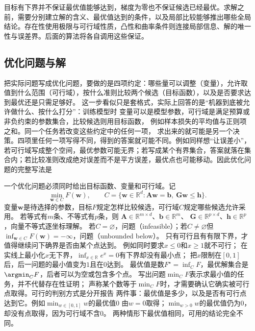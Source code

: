 目标有下界并不保证最优值能够达到，梯度为零也不保证候选已经最优。求解之前，需要分别建立解的含义、最优值达到的条件，以及局部比较能够推出哪些全局结论。存在性使用极限与可行域性质，凸性和曲率条件则连接局部信息、解的唯一性与误差界。后面的算法将各自调用这些保证。

\subsection{优化问题与解}
\label{sec:opt-problem-and-solutions}
\label{sec:opt-error-objects}

把实际问题写成优化问题，要做的是四项约定：哪些量可以调整（变量），允许取值到什么范围（可行域），按什么准则比较两个候选（目标函数），以及是否要求达到最优还是只需足够好。
这一步看似只是套格式，实际上回答的是“机器到底被允许做什么、按什么打分”：训练模型时
变量可以是模型参数，可行域是满足预算或非负约束的参数集合，比较候选则用目标函数，
例如样本损失的平均值与正则项之和。同一个任务若改变这些约定中的任何一项，
求出来的就可能是另一个决策。四项里任何一项写得不同，得到的答案就可能不同。例如同样想“让误差小”，若可行域写成整个空间，最优参数可能无界；若写成某个有界集合，答案就落在集合内；若比较准则改成绝对误差而不是平方误差，最优点也可能移动。因此优化问题的完整写法是

一个优化问题必须同时给出目标函数、变量和可行域。记
\[
  \min_{\bm{w}\in C}F(\bm{w}),\qquad
  C=\{\bm{w}\in\mathbb{R}^d:
  \bm{A}\bm{w}=\bm{b},\ \bm{G}\bm{w}\leq\bm{h}\}.
\]
变量$\bm w$是待选择的参数，目标$F$规定怎样比较候选，可行域$C$规定哪些候选允许采用。
若等式有$m$条、不等式有$p$条，则
$\bm A\in\mathbb R^{m\times d}$、$\bm b\in\mathbb R^m$、
$\bm G\in\mathbb R^{p\times d}$、$\bm h\in\mathbb R^p$，向量不等式逐坐标理解。
若$C=\varnothing$，问题（infeasible）；若$C\neq\varnothing$但
$\inf_{\bm{w}\in C}F(\bm{w})=-\infty$，问题（unbounded below）。
只有可行且有有限下界，才值得继续问下确界是否由某个点达到。
例如同时要求$x\leq0$和$x\geq1$就不可行；
在实线上最小化$x$无下界，$\inf_{x\in\mathbb R}e^x=0$有下界却没有最小点；
把$x$限制在$[0,1]$后，后一问题的最小值变为$1$且在$0$达到。
最优值是数$F^\star=\inf_C F$，最优解集合是$\argmin_C F$，后者可以为空或包含多个点。
写出问题$\min_C F$表示求最小值的任务，并不代替存在性证明；
声称某个数等于$\min_C F$时，才需要确认它确实被可行点取得。可行的判别方式是分开报告
两件事：最优值是多少，以及是否有可行点达到它。例如$\min_{w\in[0,1]}w$的最优值$0$
由$w=0$取得；$\min_{w>0}w$的最优值仍为$0$，却没有点取得，因为可行域不含$0$。
两种情形下最优值相同，可用的结论完全不同。

